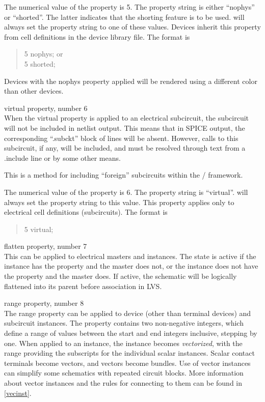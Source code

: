 \begin{description}
The numerical value of the property is 5.  The property string is
either ``{\vt nophys}'' or ``{\vt shorted}''.  The latter indicates
that the shorting feature is to be used.  {\Xic} will always set the
property string to one of these values.  Devices inherit this property
from cell definitions in the device library file.  The format is
\begin{quote}
{ 5 nophys;} or\\
{ 5 shorted;}
\end{quote}

Devices with the {\et nophys} property applied will be rendered using
a different color than other devices.

\item{\vt virtual} property, number 6\\
When the {\et virtual} property is applied to an electrical
subcircuit, the subcircuit will not be included in netlist output. 
This means that in SPICE output, the corresponding ``{\vt .subckt}''
block of lines will be absent.  However, calls to this subcircuit, if
any, will be included, and must be resolved through text from a {\vt
.include} line or by some other means.

This is a method for including ``foreign'' subcircuits within the
{\Xic}/{\WRspice} framework.

The numerical value of the property is 6.  The property string is
``{\vt virtual}''.  {\Xic} will always set the property string to this
value.  This property applies only to electrical cell definitions
(subcircuits).  The format is
\begin{quote}
 5 virtual;
\end{quote}

\item{\vt flatten} property, number 7\\
This can be applied to electrical masters and instances.  The state is
active if the instance has the property and the master does not, or
the instance does not have the property and the master does.  If
active, the schematic will be logically flattened into its parent
before association in LVS.

\item{\vt range} property, number 8\\
The {\et range} property can be applied to device (other than terminal
devices) and subcircuit instances.  The property contains two
non-negative integers, which define a range of values between the
start and end integers inclusive, stepping by one.  When applied to an
instance, the instance becomes {\it vectorized}, with the range
providing the subscripts for the individual scalar instances.  Scalar
contact terminals become vectors, and vectors become bundles.  Use of
vector instances can simplify some schematics with repeated circuit
blocks.  More information about vector instances and the rules for
connecting to them can be found in \ref{vecinst}.


\end{description}
